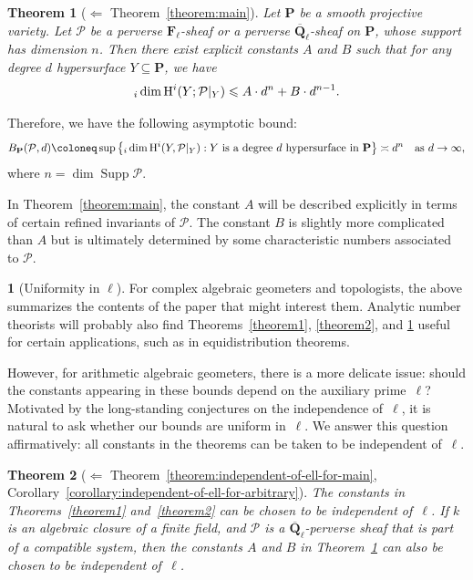 \documentclass[english]{smfart}
\let\sum\relax\DeclareMathSymbol{\sum}{\mathop}{fourier}{80}
\renewcommand{\mathbb}{\mathbf}
\renewcommand{\leq}{\leqslant}
\renewcommand{\subset}{\subseteq}
\theoremstyle{remark}
\theoremstyle{plain}
\newtheorem{theorem1}{Theorem}
\theoremstyle{definition}
\numberwithin{equation}{remark}
\theoremstyle{void}
\newtheorem{situation}[remark]{}
\begin{document}
\begin{theorem1}[\(\Leftarrow\) Theorem~\ref{theorem:main}]
\label{theorem3}
Let \(\mathbb{P}\) be a smooth projective variety.  Let
\(\mathcal{P}\) be a perverse \(\mathbb{F}_{\ell}\)-sheaf or a
perverse \(\overline{\mathbb{Q}}_{\ell}\)-sheaf on \(\mathbb{P}\),
whose support has dimension \(n\).  Then there exist explicit
constants \(A\) and \(B\) such that for any degree \(d\) hypersurface
\(Y \subset \mathbb{P}\), we have
\[
\sum_i \dim \mathrm{H}^i(Y; \mathcal{P}|_Y) \leq A \cdot d^n + B \cdot d^{n-1}.
\]
\end{theorem1}

Therefore, we have the following asymptotic bound:
\[
B_{\mathbb{P}}(\mathcal{P}, d)
\coloneq \sup\left\{
\sum_i \dim \mathrm{H}^i(Y,\mathcal{P}|_Y) : Y \text{ is a degree } d \text{ hypersurface in } \mathbb{P}
\right\}
\asymp d^n \quad \text{as } d \to \infty,
\]
where \(n = \dim \operatorname{Supp}\mathcal{P}\).

In Theorem~\ref{theorem:main}, the constant \(A\) will be described
explicitly in terms of certain refined invariants of \(\mathcal{P}\).
The constant \(B\) is slightly more complicated than \(A\)
but is ultimately determined by
some characteristic numbers associated to \(\mathcal{P}\).

\begin{situation}[Uniformity in \(\ell\)]
For complex algebraic geometers and topologists, the
above summarizes the contents of the paper that might
interest them.  Analytic number theorists will probably also
find Theorems~\ref{theorem1}, \ref{theorem2}, and \ref{theorem3}
useful for certain applications, such as in equidistribution theorems.

However, for arithmetic algebraic geometers, there is a more delicate
issue: should the constants appearing in these bounds depend on the
auxiliary prime~\(\ell\)? Motivated by the long-standing conjectures
on the independence of~\(\ell\), it is natural to ask whether our
bounds are uniform in~\(\ell\).  We answer this question
affirmatively: all constants in the theorems can be taken to be
independent of~\(\ell\).
\end{situation}

\begin{theorem1}[\(\Leftarrow\) Theorem~\ref{theorem:independent-of-ell-for-main}, Corollary~\ref{corollary:independent-of-ell-for-arbitrary}]
The constants in Theorems~\ref{theorem1} and~\ref{theorem2} can be
chosen to be independent of~\(\ell\). If \(k\) is an algebraic
closure of a finite field, and \(\mathcal{P}\) is a
\(\overline{\mathbb{Q}}_{\ell}\)-perverse sheaf that is part of a
compatible system, then the constants \(A\) and \(B\) in
Theorem~\ref{theorem3} can also be chosen to be independent of~\(\ell\).
\end{theorem1}
\end{document}
